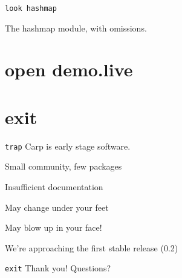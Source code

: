 \documentclass{beamer}
\begin{document}
  \begin{frame}{\texttt{look hashmap}}
    \begin{listing}[H]
      \caption{The hashmap module, with omissions.}
    \end{listing}
  \end{frame}
  \section{open demo.live}
  \section{exit}
  \begin{frame}{\texttt{trap}}
    Carp is early stage software.
    \begin{arrowlist}
      \item Small community, few packages
      \item Insufficient documentation
      \item May change under your feet
      \item May blow up in your face!
    \end{arrowlist}
    We’re approaching the first stable release (0.2)
  \end{frame}
  \begin{frame}{\texttt{exit}}
    \Huge Thank you!
    \linebreak
    \linebreak
    \linebreak
    \small Questions?
  \end{frame}
\end{document}
